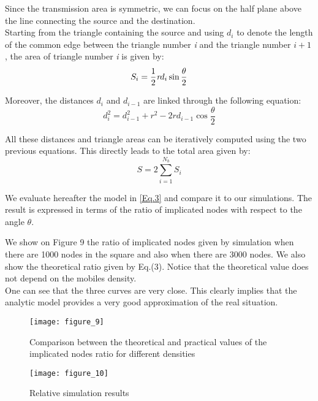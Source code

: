 \documentclass{IEEEtran}
\begin{document}
Since the transmission area is symmetric, we can focus on the half
plane above the line connecting the source and the destination.\\
Starting from the triangle containing the source and using $d_{i}$
to denote the length of the common edge between the triangle number
\emph{i} and the triangle number
    $i+1$
, the area of triangle number \emph{i} is given by:
\begin{equation}\label{eq1}
    S_{i}=\frac{1}{2} \emph{r} d_{i} \sin{\frac{\theta}{2}}
\end{equation}

Moreover, the distances $d_{i}$ and $d_{i-1}$ are linked through the
following equation:
\begin{equation}\label{eq2}
    d^{2}_{i}=d_{i-1}^{2}+r^2-2r d_{i-1}\cos{\frac{\theta}{2}}
\end{equation}

All these distances and triangle areas can be iteratively computed
using the two previous equations. This directly leads to the total
area given by:
\begin{equation}\label{Eq.3}
    S=2\sum _{i=1}^{N_{b}}S_{i}
\end{equation}

We evaluate hereafter the model in \eqref{Eq.3} and compare it to
our simulations. The result is expressed in terms of the ratio of
implicated nodes with respect to the angle $\theta$.

We show on Figure 9 the ratio of implicated nodes given by
simulation when there are 1000 nodes in the square and also when
there are 3000 nodes. We also show the theoretical ratio given by
Eq.(3). Notice that the theoretical value does not depend on the
mobiles density.
\\
One can see that the three curves are very close. This clearly
implies that the analytic model provides a very good approximation
of the real situation.

\begin{figure}[!htbp]
  \begin{center}
\texttt{[image: figure\_9]}
  \end{center}
  \caption{Comparison between the theoretical and practical values of the implicated nodes ratio for different densities}
\end{figure}

\begin{figure}[!htbp]
  \begin{center}
\texttt{[image: figure\_10]}
  \end{center}
  \caption{Relative simulation results}
\end{figure}
\end{document}
